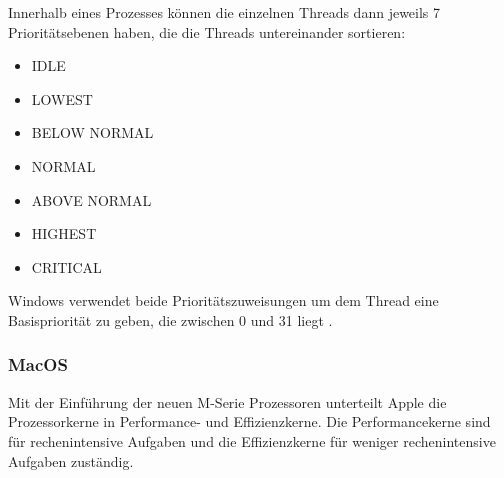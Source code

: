 Innerhalb eines Prozesses können die einzelnen Threads dann jeweils 7 Prioritätsebenen haben, die die Threads untereinander sortieren:
\begin{multicols}{3}
    \begin{itemize}[noitemsep]
        \item IDLE
        \item LOWEST
        \item BELOW NORMAL
        \item NORMAL
        \item ABOVE NORMAL
        \item HIGHEST
        \item CRITICAL
    \end{itemize}
\end{multicols}

Windows verwendet beide Prioritätszuweisungen um dem Thread eine Basispriorität zu geben, die zwischen 0 und 31 liegt \autocite{KarlBridgeMicrosoft.2023}.

\subsubsection{MacOS}
Mit der Einführung der neuen M-Serie Prozessoren unterteilt Apple die Prozessorkerne in Performance- und Effizienzkerne. Die Performancekerne sind für rechenintensive Aufgaben und die Effizienzkerne für weniger rechenintensive Aufgaben zuständig.